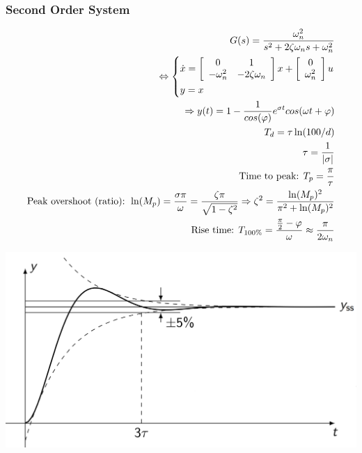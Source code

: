     \subsubsection{Second Order System}
        \begin{align*}
            G(s) = \frac{\omega_n^2}{s^2 + 2 \zeta \omega_n s + \omega_n^2}\\
            \Leftrightarrow 
            \begin{cases*}
                \dot{x} = 
                    \left[\begin{array}{c c}
                        0 & 1\\
                        -\omega_n^2 & -2 \zeta \omega_n
                    \end{array}\right]
                    x + 
                    \left[\begin{array}{c}
                        0\\
                        \omega_n^2
                    \end{array}\right] u\\
                y = x
            \end{cases*}\\
            \Rightarrow y(t) = 1 - \frac{1}{cos(\varphi)}e^{\sigma t} cos(\omega t + \varphi)\\
            T_d = \tau \ln(100/d)\\
            \tau = \frac{1}{|\sigma|}\\
            \text{Time to peak: } T_p = \frac{\pi}{\tau}\\
            \text{Peak overshoot (ratio): } \ln(M_p) = \frac{\sigma \pi}{\omega} = \frac{\zeta \pi}{\sqrt{1 - \zeta^2}} \Rightarrow \zeta^2 = \frac{\ln(M_p)^2}{\pi^2 + \ln(M_p)^2}\\
            \text{Rise time: } T_{100 \%} = \frac{\frac{\pi}{2} - \varphi}{\omega} \approx \frac{\pi}{2 \omega_n}
        \end{align*}
        
        \includegraphics[width = \linewidth]{src/images/second_order_step_response.png}

